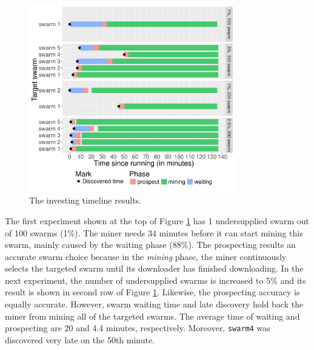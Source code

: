 \begin{figure}[th]
		\centering
		\includegraphics[width=0.8\textwidth]{pics/results/time-merge.pdf}
	\caption{The investing timeline results.}
	\label{fig:timeprosexp}
\end{figure}

The first experiment shown at the top of Figure \ref{fig:timeprosexp} has 1 undersupplied swarm out of 100 swarms (1\%). The miner needs 34 minutes before it can start mining this swarm, mainly caused by the waiting phase (88\%). The prospecting results an accurate swarm choice because in the \textit{mining} phase, the miner continuously selects the targeted swarm until its downloader has finished downloading. In the next experiment, the number of undersupplied swarms is increased to 5\% and its result is shown in second row of Figure \ref{fig:timeprosexp}. Likewise, the prospecting accuracy is equally accurate. However, swarm waiting time and late discovery hold back the miner from mining all of the targeted swarms. The average time of waiting and prospecting are 20 and 4.4 minutes, respectively. Moreover, \texttt{swarm4} was discovered very late on the 50th minute.

